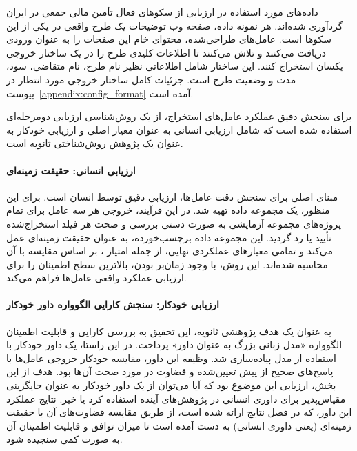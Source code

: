 داده‌های مورد استفاده در ارزیابی از سکوهای فعال تأمین مالی جمعی در ایران گردآوری شده‌اند. هر نمونه داده، صفحه وب توضیحات یک طرح واقعی در یکی از این سکوها است. عامل‌های طراحی‌شده، محتوای  خام این صفحات را به عنوان ورودی دریافت می‌کنند و تلاش می‌کنند تا اطلاعات کلیدی طرح را در یک ساختار خروجی یکسان استخراج کنند. این ساختار شامل اطلاعاتی نظیر نام طرح، نام متقاضی، سود، مدت و وضعیت طرح است. جزئیات کامل ساختار خروجی مورد انتظار در پیوست~\ref{appendix:config_format} آمده است.

برای سنجش دقیق عملکرد عامل‌های استخراج، از یک روش‌شناسی ارزیابی دومرحله‌ای استفاده شده است که شامل ارزیابی انسانی به عنوان معیار اصلی و ارزیابی خودکار به عنوان یک پژوهش روش‌شناختی ثانویه است.

\paragraph{ارزیابی انسانی: حقیقت زمینه‌ای}
مبنای اصلی برای سنجش دقت عامل‌ها، ارزیابی دقیق توسط انسان است. برای این منظور، یک مجموعه داده تهیه شد. در این فرآیند، خروجی هر سه عامل برای تمام پروژه‌های مجموعه آزمایشی به صورت دستی بررسی و صحت هر فیلد استخراج‌شده تأیید یا رد گردید. این مجموعه داده برچسب‌خورده، به عنوان حقیقت زمینه‌ای عمل می‌کند و تمامی معیارهای عملکردی نهایی، از جمله امتیاز ، بر اساس مقایسه با آن محاسبه شده‌اند. این روش، با وجود زمان‌بر بودن، بالاترین سطح اطمینان را برای ارزیابی عملکرد واقعی عامل‌ها فراهم می‌کند.

\paragraph{ارزیابی خودکار: سنجش کارایی الگوواره داور خودکار}
به عنوان یک هدف پژوهشی ثانویه، این تحقیق به بررسی کارایی و قابلیت اطمینان الگوواره «مدل زبانی بزرگ به عنوان داور» پرداخت. در این راستا، یک داور خودکار با استفاده از مدل  پیاده‌سازی شد. وظیفه این داور، مقایسه خودکار خروجی عامل‌ها با پاسخ‌های صحیح از پیش تعیین‌شده و قضاوت در مورد صحت آن‌ها بود. هدف از این بخش، ارزیابی این موضوع بود که آیا می‌توان از یک داور خودکار به عنوان جایگزینی مقیاس‌پذیر برای داوری انسانی در پژوهش‌های آینده استفاده کرد یا خیر. نتایج عملکرد این داور، که در فصل نتایج ارائه شده است، از طریق مقایسه قضاوت‌های آن با حقیقت زمینه‌ای (یعنی داوری انسانی) به دست آمده است تا میزان توافق و قابلیت اطمینان آن به صورت کمی سنجیده شود.
